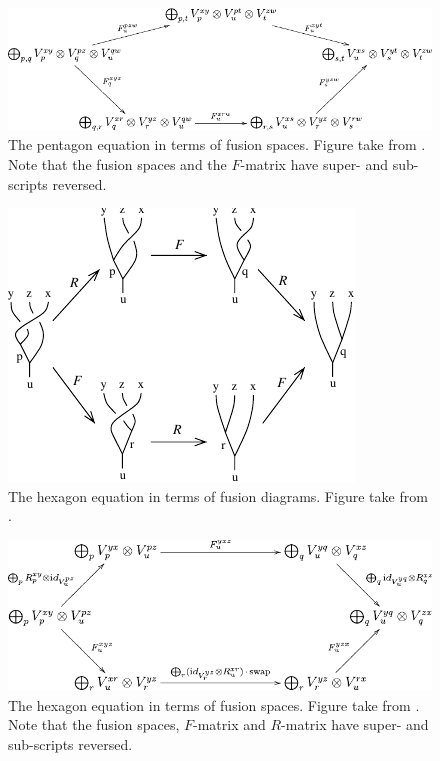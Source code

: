 \documentclass[a4paper,10pt,oneside]{book}
\theoremstyle{plain}
\theoremstyle{definition}
\theoremstyle{remark}
\begin{document}
\begin{figure}[h]
  \centering
  \includegraphics[width=1\linewidth]{img/pentagon_space.pdf}
  \caption{The pentagon equation in terms of fusion spaces. Figure take from \cite{kitaev}. Note that the fusion spaces and the $F$-matrix have super- and sub-scripts reversed.}
  \label{fig:pentagon_space}
\end{figure}

\begin{figure}[h]
  \centering
  \includegraphics[width=0.8\linewidth]{img/hexagon_diagram.pdf}
  \caption{The hexagon equation in terms of fusion diagrams. Figure take from \cite{kitaev}.}
  \label{fig:hexagon_diagram}
\end{figure}

\begin{figure}[h]
  \centering
  \includegraphics[width=1\linewidth]{img/hexagon_space.pdf}
  \caption{The hexagon equation in terms of fusion spaces. Figure take from \cite{kitaev}. Note that the fusion spaces, $F$-matrix and $R$-matrix have super- and sub-scripts reversed.}
  \label{fig:hexagon_space}
\end{figure}
\end{document}
